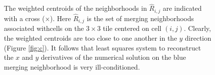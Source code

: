 \begin{figure}
    \centering
     \hfill
     \hfill
    \caption{\sf 
    The weighted centroids of the neighborhoods in $\widehat{R}_{i,j}$ are indicated with a cross ($\times$).  
    Here $\widehat{R}_{i,j}$ is the set of merging neighborhoods associated
    withcells on the $3\times3$ tile centered on cell $(i,j)$.
    Clearly, the weighted centroids are too close to one another in the $y$ direction (Figure \ref{fig:c}).  It follows that least squares system to reconstruct the $x$ and $y$ derivatives of the numerical solution on the blue merging neighborhood is very ill-conditioned.
}
    \label{fig:tooclose}
\end{figure}

